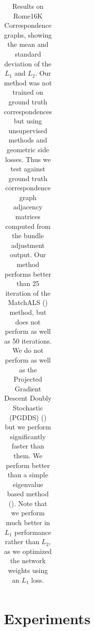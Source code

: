 \documentclass{article} %
\begin{document}
\begin{table}[t]
\begin{center}
\begin{tabular}{|l|c|c|c|c|}
\end{tabular}
\end{center}

\caption{
Results on Rome16K Correspondence graphs, showing the mean and standard deviation of the $L_1$ and $L_2$.
Our method was not trained on ground truth correspondences but using unsupervised methods and geometric side losses.
Thus we test against ground truth correspondence graph adjacency matrices computed from the bundle adjustment output.
Our method performs better than 25 iteration of the MatchALS (\cite{zhou2015multi}) method, but does not perform as well as 50 iterations.
We do not perform as well as the Projected Gradient Descent Doubly Stochastic (PGDDS) (\cite{leonardos2016distributed}) but we perform significantly faster than them.
We perform better than a simple eigenvalue based method (\cite{pachauri2013solving}).
Note that we perform much better in $L_1$ performance rather than $L_2$, as we optimized the network weights using an $L_1$ loss.
}
\label{tab:rome16ktab}
\end{table}



\section{Experiments}

\end{document}
